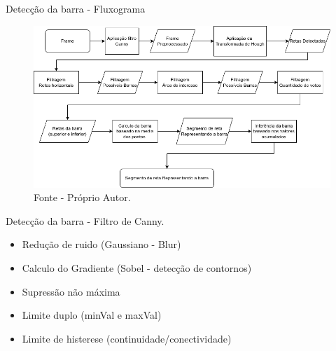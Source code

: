










\begin{frame}{Detecção da barra - Fluxograma}
    \begin{figure}[!ht]
    \centering
    \includegraphics[scale=0.4]{img/desenvolvimento/detectaBarra/fluxograma.png}
    \caption*{Fonte - Próprio Autor.}
    \end{figure}
\end{frame}

\begin{frame}{Detecção da barra - Filtro de Canny.}
    \begin{itemize}
        \item  Redução de ruido (Gaussiano - Blur)
        \item  Calculo do Gradiente (Sobel - detecção de contornos)
        \item  Supressão não máxima  
        \item  Limite duplo (minVal e maxVal)
        \item  Limite de histerese (continuidade/conectividade)
    \end{itemize}
\end{frame}

